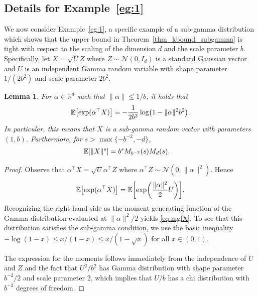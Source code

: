 \documentclass{article}
\newtheorem{lemma}[theorem]{Lemma}
\theoremstyle{definition}
\newcommand{\reals}{\mathbb{R}}
\newcommand{\ex}[1]{\ensuremath{\mathbb{E}\left[ #1\right]}}
\newcommand{\normal}{\mathcal{N}}
\let\originalleft\left
\let\originalright\right
\renewcommand{\left}{\mathopen{}\mathclose\bgroup\originalleft}
\renewcommand{\right}{\aftergroup\egroup\originalright}
\begin{document}
\subsection{Details for Example~\ref{eg:1}}\label{sec:example_sub_gamma}

We now consider Example~\ref{eg:1}, a specific example of a sub-gamma distribution which shows that the upper bound in Theorem~\ref{thm_kbound_subgamma} is tight with respect to the scaling of the dimension $d$ and the scale parameter $b$. Specifically, let $X = \sqrt{U}Z$ where $Z \sim \normal(0, I_d)$ is a standard Gaussian vector and $U$ is an independent Gamma random variable with shape parameter $1/(2 b^2)$ and scale parameter $2 b^2$. 

\begin{lemma}
For  $\alpha \in \reals^d$ such that $\|\alpha\| \le 1/b$, it holds that
\begin{align}
    \ex{\exp( \alpha^\top X)}  = - \frac{1}{2 b^2} \log\left( 1 - \|\alpha\|^2 b^2  \right). \label{eq:mgfX}
\end{align}
In particular, this means that $X$ is a sub-gamma random vector with parameters $(1, b)$. Furthermore, for $s > \max\{ -b^{-2}, -d\}$,
\begin{align}
\ex{ \|X\|^s} & =  b^s M_{b^{-2}}(s) M_{d}(s).
\end{align}
\end{lemma}
\begin{proof}
Observe that $\alpha^\top X = \sqrt{U} \alpha^\top Z$ where $\alpha^\top Z \sim \normal(0,\|\alpha\|^2)$. Hence
\begin{align*}
    \ex{\exp( \alpha^\top X)}  = \ex{ \exp\left( \frac{\|\alpha\|^2}{2} U \right)}.
\end{align*}
Recognizing the right-hand side as the moment generating function of the Gamma distribution evaluated at $\|\alpha\|^2/2$ yields \eqref{eq:mgfX}. To see that this distribution satisfies the sub-gamma condition, we use the basic inequality $
- \log(1-x) \le x/(1-x)  \le x/(1 - \sqrt{x})$ for all $x \in (0,1)$. 

The expression for the moments follows immediately from the independence of $U$ and $Z$ and the fact that $U^2/b^{2}$ has Gamma distribution with shape parameter $b^{-2}/2$ and scale parameter $2$, which implies that $U/b$ has a chi distribution with $b^{-2}$ degrees of freedom.  
\end{proof}
\end{document}
